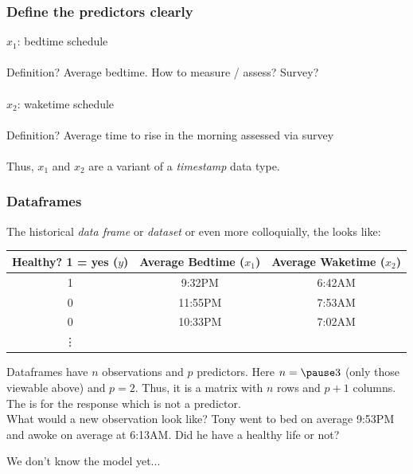 \documentclass[handout]{beamer}
\begin{document}
\begin{frame}\frametitle{Define the predictors clearly}

$x_1$: bedtime schedule \\~\\

Definition? \pause Average bedtime. \pause How to measure / assess? Survey? \\~\\	



$x_2$: waketime schedule \\~\\	

Definition? \pause Average time to rise in the morning assessed via survey\\~\\	

Thus, $x_1$ and $x_2$ are a variant of a \textit{timestamp} data type.

\end{frame}

\begin{frame}\frametitle{Dataframes}

\small
The historical \textit{data frame} or \textit{dataset} or even more colloquially, the  looks like:

\begin{table}
\centering
\small
\begin{tabular}{ccc}
Healthy? 1 = yes ($y$) & Average Bedtime ($x_1$) & Average Waketime ($x_2$) \\ \hline
1 & 9:32PM & 6:42AM \\
0 & 11:55PM & 7:53AM \\
0 & 10:33PM & 7:02AM \\
\vdots
\end{tabular}
\end{table}

Dataframes have $n$ observations and $p$ predictors. Here $n = \pause 3$ (only those viewable above) and $p = 2$. Thus, it is a matrix with $n$ rows and $p + 1$ columns. The  is for the response which is not a predictor. \\

What would a new observation look like? Tony went to bed on average 9:53PM and awoke on average at 6:13AM. Did he have a healthy life or not?

We don't know the model yet...
	
\end{frame}
\end{document}
